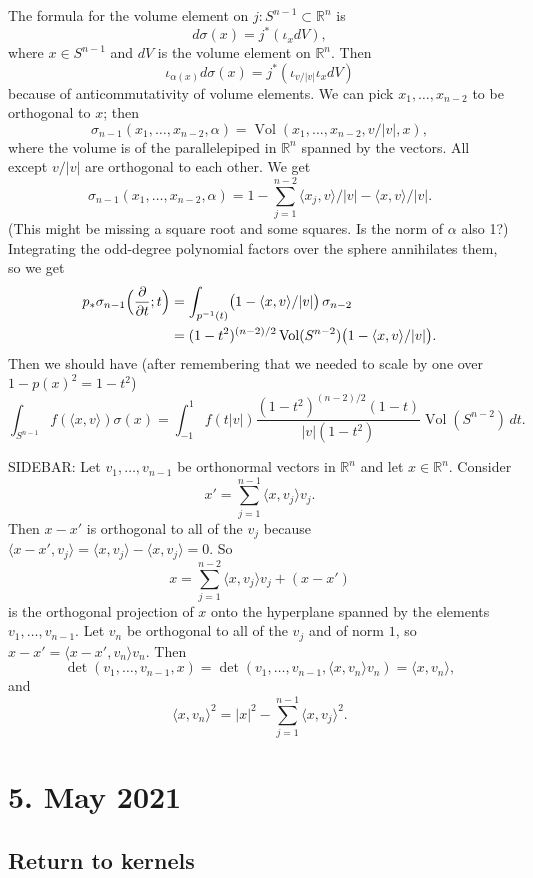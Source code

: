 \documentclass[11pt]{article}
\theoremstyle{definition}
\newcommand{\kk}[1]{\mathbb{#1}}
\DeclareMathOperator{\Vol}{Vol}
\begin{document}
The formula for the volume element on $j : S^{n-1} \subset \kk R^n$ is
\[
d\sigma(x) = j^*(\iota_x dV),
\]
where $x \in S^{n-1}$ and $dV$ is the volume element on $\kk R^n$. Then
\[
\iota_{\alpha(x)} d\sigma(x)
= j^*(\iota_{v/|v|} \iota_x dV)
\]
because of anticommutativity of volume elements.
We can pick $x_1,\ldots,x_{n-2}$ to be orthogonal to $x$; then
\[
\sigma_{n-1}(x_1,\ldots,x_{n-2},\alpha)
= \Vol(x_1,\ldots,x_{n-2},v/|v|,x),
\]
where the volume is of the parallelepiped in $\kk R^n$ spanned by the vectors. All except $v/|v|$ are orthogonal to each other. We get
\[
\sigma_{n-1}(x_1,\ldots,x_{n-2},\alpha)
= 1 - \sum_{j=1}^{n-2} \langle x_j, v \rangle / |v| - \langle x, v \rangle / |v|.
\]
(This might be missing a square root and some squares. Is the norm of $\alpha$ also 1?)
Integrating the odd-degree polynomial factors over the sphere annihilates them, so we get
\begin{align*}
p_* \sigma_{n-1}\Bigl(\frac{\partial}{\partial t}; t \Bigr)
&= \int_{p^{-1}(t)} \bigl(1 - \langle x, v \rangle / |v| \bigr) \, \sigma_{n-2}
\\
  &= (1-t^2)^{(n-2)/2} \Vol(S^{n-2}) \bigl(1 - \langle x, v \rangle / |v| \bigr).
\end{align*}
Then we should have (after remembering that we needed to scale by one over $1-p(x)^2 = 1-t^2$)
\[
\int_{S^{n-1}} f(\langle x, v \rangle) \sigma(x)
= \int_{-1}^1 f(t|v|) \frac{(1-t^2)^{(n-2)/2} (1 - t)}{|v| (1-t^2)} \Vol(S^{n-2}) \, dt.
\]


SIDEBAR: Let $v_1,\ldots,v_{n-1}$ be orthonormal vectors in $\kk R^n$ and let $x \in \kk R^n$. Consider
\[
x' = \sum_{j=1}^{n-1} \langle x, v_j \rangle v_j.
\]
Then $x - x'$ is orthogonal to all of the $v_j$ because $\langle x - x', v_j \rangle = \langle x, v_j \rangle - \langle x, v_j \rangle = 0$. So
\[
x = \sum_{j=1}^{n-2} \langle x, v_j \rangle v_j + (x - x')
\]
is the orthogonal projection of $x$ onto the hyperplane spanned by
the elements $v_1,\ldots,v_{n-1}$.
Let $v_n$ be orthogonal to all of the $v_j$ and of norm
$1$, so $x - x' = \langle x - x', v_n \rangle v_n$. Then
\[
\det(v_1,\ldots,v_{n-1}, x)
= \det(v_1,\ldots,v_{n-1}, \langle x, v_n \rangle v_n)
= \langle x, v_n \rangle,
\]
and
\[
\langle x, v_n \rangle^2
= |x|^2 - \sum_{j=1}^{n-1} \langle x, v_j \rangle^2.
\]




\section*{5. May 2021}
\subsection*{Return to kernels}
\end{document}
